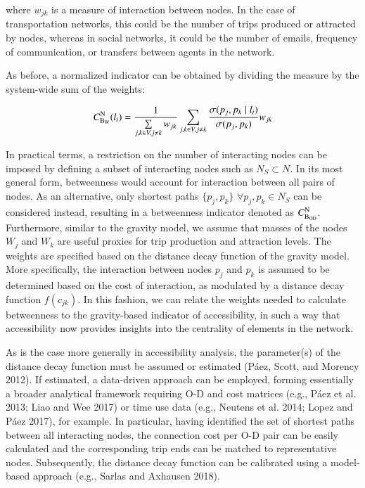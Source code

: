\documentclass[]{elsarticle} %
\begin{document}
\noindent where \(w_{jk}\) is a measure of interaction between nodes. In
the case of transportation networks, this could be the number of trips
produced or attracted by nodes, whereas in social networks, it could be
the number of emails, frequency of communication, or transfers between
agents in the network.

As before, a normalized indicator can be obtained by dividing the
measure by the system-wide sum of the weights:

\begin{equation}\label{f:btw_weight_norm}
C_{\rm B_W}^{\rm N}(l_i)= \frac{1}{\sum\limits_{j,k \space \in V,j\neq k} w_{jk}}\sum\limits_{j,k \space \in V,j\neq k} \frac{{\sigma(p_j,p_k \mid l_i)}}{\sigma(p_j,p_k)}w_{jk}
\end{equation}

In practical terms, a restriction on the number of interacting nodes can
be imposed by defining a subset of interacting nodes such as
\(N_{S} \subset N\). In its most general form, betweenness would account
for interaction between all pairs of nodes. As an alternative, only
shortest paths \(\{p_j,p_k\}\) \(\forall p_j,p_k \in N_{S}\) can be
considered instead, resulting in a betweenness indicator denoted as
\(C_{\rm B_{OD}}^{\rm N}\). Furthermore, similar to the gravity model,
we assume that masses of the nodes \(W_j\) and \(W_k\) are useful
proxies for trip production and attraction levels. The weights are
specified based on the distance decay function of the gravity model.
More specifically, the interaction between nodes \(p_j\) and \(p_k\) is
assumed to be determined based on the cost of interaction, as modulated
by a distance decay function \(f(c_{jk})\). In this fashion, we can
relate the weights needed to calculate betweenness to the gravity-based
indicator of accessibility, in such a way that accessibility now
provides insights into the centrality of elements in the network.

As is the case more generally in accessibility analysis, the
parameter(s) of the distance decay function must be assumed or estimated
(Páez, Scott, and Morency 2012). If estimated, a data-driven approach
can be employed, forming essentially a broader analytical framework
requiring O-D and cost matrices (e.g., Páez et al. 2013; Liao and Wee
2017) or time use data (e.g., Neutens et al. 2014; Lopez and Páez 2017),
for example. In particular, having identified the set of shortest paths
between all interacting nodes, the connection cost per O-D pair can be
easily calculated and the corresponding trip ends can be matched to
representative nodes. Subsequently, the distance decay function can be
calibrated using a model-based approach (e.g., Sarlas and Axhausen
2018).
\end{document}
